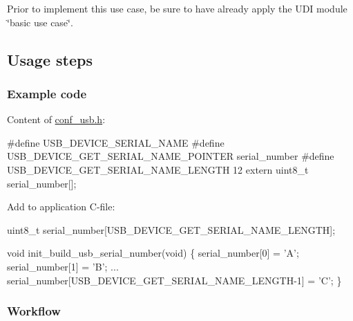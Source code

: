 Prior to implement this use case, be sure to have already apply the U\-D\-I module \char`\"{}basic use case\char`\"{}.\hypertarget{udc_use_case_6_udc_use_case_6_usage}{}\subsection{Usage steps}\label{udc_use_case_6_udc_use_case_6_usage}
\hypertarget{udc_use_case_6_udc_use_case_6_usage_code}{}\subsubsection{Example code}\label{udc_use_case_6_udc_use_case_6_usage_code}
Content of \hyperlink{conf__usb_8h}{conf\-\_\-usb.\-h}\-: 
\begin{DoxyCode}
\textcolor{preprocessor}{        #define  USB\_DEVICE\_SERIAL\_NAME}
\textcolor{preprocessor}{}\textcolor{preprocessor}{        #define  USB\_DEVICE\_GET\_SERIAL\_NAME\_POINTER serial\_number}
\textcolor{preprocessor}{}\textcolor{preprocessor}{        #define  USB\_DEVICE\_GET\_SERIAL\_NAME\_LENGTH  12}
\textcolor{preprocessor}{        extern uint8\_t serial\_number[];}
\end{DoxyCode}


Add to application C-\/file\-: 
\begin{DoxyCode}
         uint8\_t serial\_number[USB\_DEVICE\_GET\_SERIAL\_NAME\_LENGTH];

         \textcolor{keywordtype}{void} init\_build\_usb\_serial\_number(\textcolor{keywordtype}{void})
         \{
         serial\_number[0] = \textcolor{charliteral}{'A'};
         serial\_number[1] = \textcolor{charliteral}{'B'};
         ...
         serial\_number[USB\_DEVICE\_GET\_SERIAL\_NAME\_LENGTH-1] = \textcolor{charliteral}{'C'};
         \} 
\end{DoxyCode}
\hypertarget{udc_use_case_6_udc_use_case_6_usage_flow}{}\subsubsection{Workflow}\label{udc_use_case_6_udc_use_case_6_usage_flow}

